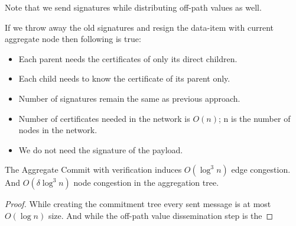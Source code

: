 	Note that we send signatures while distributing off-path values as well.

	If we throw away the old signatures and resign the data-item with current aggregate node then following is true:
		\begin{itemize}
			\item Each parent needs the certificates of only its direct children.
			\item Each child needs to know the certificate of its parent only.
			\item Number of signatures remain the same as previous approach.
			\item Number of certificates needed in the network is $O(n)$; n is the number of nodes in the network.
			\item We do not need the signature of the payload.
		\end{itemize}



	\begin{theorem}
	\cite{chan2006secure}
	The Aggregate Commit with verification induces $O(\log^3 n)$ edge congestion. And $O(\delta\log^3 n)$ node congestion in the aggregation tree.
	\end{theorem}
	\begin{proof}
		While creating the commitment tree every sent message is at most $O(\log n)$ size.
		And while the off-path value dissemination step is the
	\end{proof}


